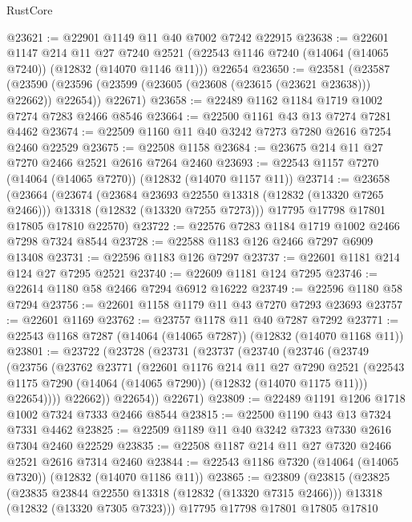 \begin{lexlean}{RustCore}
\begin{coremodule}
@23621 := @22901 @1149 @11 @40 @7002 @7242 @22915
@23638 := @22601
    @1147
    @214
    @11
    @27
    @7240
    @2521
    (@22543 @1146 @7240 (@14064 (@14065 @7240)) (@12832 (@14070 @1146 @11)))
    @22654
@23650 := @23581
    (@23587
      (@23590 (@23596 (@23599 (@23605 (@23608 (@23615 (@23621 @23638))) @22662)) @22654))
      @22671)
@23658 := @22489 @1162 @1184 @1719 @1002 @7274 @7283 @2466 @8546
@23664 := @22500 @1161 @43 @13 @7274 @7281 @4462
@23674 := @22509 @1160 @11 @40 @3242 @7273 @7280 @2616 @7254 @2460 @22529
@23675 := @22508 @1158
@23684 := @23675 @214 @11 @27 @7270 @2466 @2521 @2616 @7264 @2460
@23693 := @22543 @1157 @7270 (@14064 (@14065 @7270)) (@12832 (@14070 @1157 @11))
@23714 := @23658
    (@23664
      (@23674
        (@23684 @23693 @22550 @13318 (@12832 (@13320 @7265 @2466)))
        @13318
        (@12832 (@13320 @7255 @7273)))
      @17795
      @17798
      @17801
      @17805
      @17810
      @22570)
@23722 := @22576 @7283 @1184 @1719 @1002 @2466 @7298 @7324 @8544
@23728 := @22588 @1183 @126 @2466 @7297 @6909 @13408
@23731 := @22596 @1183 @126 @7297
@23737 := @22601 @1181 @214 @124 @27 @7295 @2521
@23740 := @22609 @1181 @124 @7295
@23746 := @22614 @1180 @58 @2466 @7294 @6912 @16222
@23749 := @22596 @1180 @58 @7294
@23756 := @22601 @1158 @1179 @11 @43 @7270 @7293 @23693
@23757 := @22601 @1169
@23762 := @23757 @1178 @11 @40 @7287 @7292
@23771 := @22543 @1168 @7287 (@14064 (@14065 @7287)) (@12832 (@14070 @1168 @11))
@23801 := @23722
    (@23728
      (@23731
        (@23737
          (@23740
            (@23746
              (@23749
                (@23756
                  (@23762
                    @23771
                    (@22601
                      @1176
                      @214
                      @11
                      @27
                      @7290
                      @2521
                      (@22543 @1175 @7290 (@14064 (@14065 @7290)) (@12832 (@14070 @1175 @11)))
                      @22654))))
              @22662))
          @22654))
      @22671)
@23809 := @22489 @1191 @1206 @1718 @1002 @7324 @7333 @2466 @8544
@23815 := @22500 @1190 @43 @13 @7324 @7331 @4462
@23825 := @22509 @1189 @11 @40 @3242 @7323 @7330 @2616 @7304 @2460 @22529
@23835 := @22508 @1187 @214 @11 @27 @7320 @2466 @2521 @2616 @7314 @2460
@23844 := @22543 @1186 @7320 (@14064 (@14065 @7320)) (@12832 (@14070 @1186 @11))
@23865 := @23809
    (@23815
      (@23825
        (@23835 @23844 @22550 @13318 (@12832 (@13320 @7315 @2466)))
        @13318
        (@12832 (@13320 @7305 @7323)))
      @17795
      @17798
      @17801
      @17805
      @17810

\end{coremodule}
\end{lexlean}
